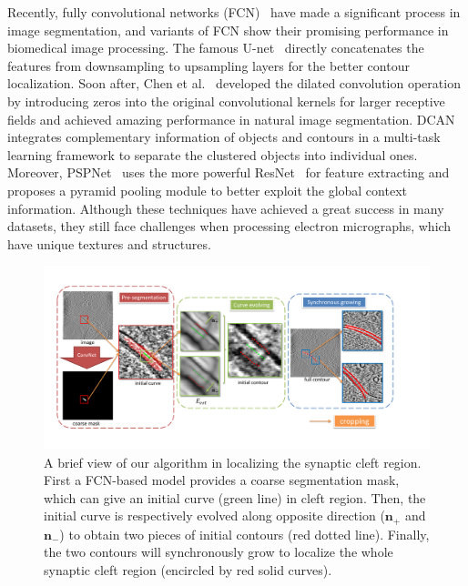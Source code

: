 Recently, fully convolutional networks (FCN)~\cite{Long2015,Ronneberger2015,Chen2016a,Chen2017,Zhao2016} have made a significant process in image segmentation, and variants of FCN \cite{Ronneberger2015,Chen2017,Dhungel2015,Lieman-Sifry2017,Chen2016b,Ourselin} show their promising performance in biomedical image processing.
%
The famous U-net~\cite{Ronneberger2015} directly concatenates the features from downsampling to upsampling layers for the better contour localization.
Soon after, Chen et al.~\cite{Chen2016a} developed the dilated convolution operation by introducing zeros into the original convolutional kernels for larger receptive fields and achieved amazing performance in natural image segmentation.
DCAN~\cite{Chen2017} integrates complementary information of objects and contours in a multi-task learning framework to separate the clustered  objects into individual ones.
Moreover, PSPNet~\cite{Zhao2016} uses the more powerful ResNet~\cite{He2016} for feature extracting and proposes a pyramid pooling module to better exploit the global context information.
%
Although these techniques have achieved a great success in many datasets, they still face challenges when processing electron micrographs, which have unique textures and structures.

\begin{figure}[t]
    \begin{center}
        \includegraphics[width=7in]{figs/FigCG.pdf}
   \end{center}
\caption{A brief view of our algorithm in localizing the synaptic cleft region. First a FCN-based model provides a coarse segmentation mask, which can give an initial curve (green line) in cleft region.
        Then, the initial curve is respectively evolved along opposite direction ($\mathbf{n}_+$ and $\mathbf{n}_-$) to obtain two pieces of initial contours (red dotted line).
        Finally, the two contours will synchronously grow to localize the whole synaptic cleft region (encircled by red solid curves).}
\label{fig:cg}
\end{figure}

